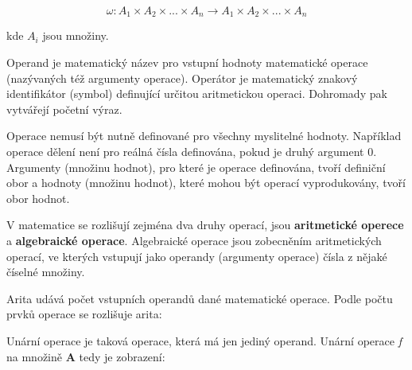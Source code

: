 $$ \omega : A_1 \times A_2 \times ... \times A_n \rightarrow A_1 \times A_2 \times ... \times A_n $$

kde $A_i$ jsou množiny.


Operand je matematický název pro vstupní hodnoty matematické operace (nazývaných též argumenty operace). Operátor je matematický znakový identifikátor (symbol) definující určitou aritmetickou operaci. Dohromady pak vytvářejí početní výraz.

Operace nemusí být nutně definované pro všechny myslitelné hodnoty. Například operace dělení není pro reálná čísla definována, pokud je druhý argument 0. Argumenty (množinu hodnot), pro které je operace definována, tvoří definiční obor a hodnoty (množinu hodnot), které mohou být operací vyprodukovány, tvoří obor hodnot.

V matematice se rozlišují zejména dva druhy operací, jsou {\bf aritmetické operece} a {\bf algebraické operace}. Algebraické operace jsou zobecněním aritmetických operací, ve kterých vstupují jako operandy (argumenty operace) čísla z nějaké číselné množiny.



Arita udává počet vstupních operandů dané matematické operace.
Podle počtu prvků operace se rozlišuje arita:

\vskip 4mm
\vskip 4mm


Unární operace je taková operace, která má jen jediný operand. Unární operace {\it f} na množině {\bf A} tedy je zobrazení:

